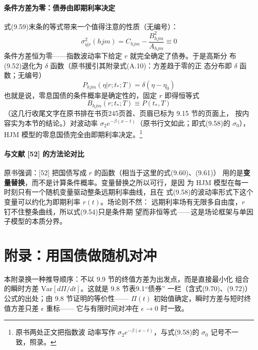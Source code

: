 \paragraph{条件方差为零：债券由即期利率决定}
式(9.59)末条的等式带来一个值得注意的性质（无编号）：
\begin{equation*}
\sigma_{\eta|r}^{2}(hjm)=C_{hjm}-\frac{B_{hjm}^{2}}{A_{hjm}}\equiv0
\end{equation*}
条件方差恒为零——指数波动率下给定 $r$ 就完全确定了债券。于是高斯分
布(9.52)退化为 $\delta$ 函数（原书援引其附录式(A.10)：方差趋于零的正
态分布即 $\delta$ 函数；无编号）
\begin{equation*}
P_{hjm}(\eta|r;t_*;T)=\delta(\eta-\eta_0)
\end{equation*}
也就是说，零息国债的条件概率是确定性的，固定 $r$ 即得恒等式
\begin{equation*}
B_{hjm}(r;t_*;T)\equiv P(t_*,T)\tag{9.62}
\end{equation*}
（这几行收尾文字在原书排在书页245页首、页眉已标为 9.15 节的页面上，
按内容实为本节的结论。）对波动率
$\sigma_2e^{-\beta(x-t)}$（原书行文如此；即式(9.58)的 $\sigma_0$），
HJM 模型的零息国债完全由即期利率决定。\footnote{原书两处正文把指数波
动率写作 $\sigma_2e^{-\beta(x-t)}$，与式(9.58)的 $\sigma_0$ 记号不一
致，照录。}

\paragraph{与文献 [52] 的方法论对比}
原书强调：[52] 把国债写成 $r$ 的函数（相当于这里的式(9.60)、(9.61)）
用的是\textbf{变量替换}，而不是计算条件概率。变量替换之所以可行，是因
为 HJM 模型在每一时刻只有一个随机变量驱动整条远期利率曲线，且在
式(9.58)的波动率形式下这个变量可以约化为即期利率 $r(t)$。场论则不然：
远期利率场有无限多自由度，$r$ 钉不住整条曲线，所以式(9.54)只是条件期
望而非恒等式——这是场论框架与单因子模型的本质分界。

\section{附录：用国债做随机对冲}

本附录换一种推导顺序：不以 9.9 节的终值方差为出发点，而是直接最小化
组合的瞬时方差 $\mathrm{Var}[d\Pi/dt]$。这就是 9.8 节表9.1“债券”
一栏（含式(9.70)、(9.72)）公式的出处；由 9.8 节证明的等价性——
$\Pi(t)$ 初始值确定，瞬时方差与短时终值方差只差 $\epsilon$ 重标——
它与有限时间对冲在 $\epsilon\to0$ 时一致。

